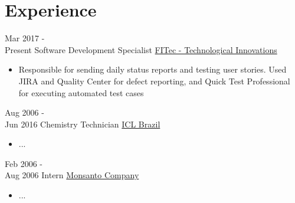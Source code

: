 \documentclass[letterpaper]{twentysecondcv} %
\begin{document}

\section{Experience}

\begin{twenty} %
	\twentyitem
    	{Mar 2017 - \\Present}
        {Software Development Specialist}
        {\href{http://www.localxchange.ca/}{FITec - Technological Innovations}}
        {}
        {
        {\begin{itemize}
        \item Responsible for sending daily status reports and testing user stories. Used JIRA and Quality Center for defect reporting, and Quick Test Professional for executing automated test cases
    \end{itemize}}
        }
        
    \twentyitem
   		{Aug 2006 - \\ Jun 2016}
        {Chemistry Technician}
        {\href{http://www.icl-pp.com/}{ICL Brazil}}
        {}
        {
        {\begin{itemize}
        \item ...
    \end{itemize}}
        }
        
     \twentyitem
   		{Feb 2006 - \\ Aug 2006}
        {Intern}
        {\href{http://www.monsanto.com/}{Monsanto Company}}
        {}
        {
        \begin{itemize}
        \item ...
    \end{itemize}
    	}
        
\end{twenty}
\end{document}
